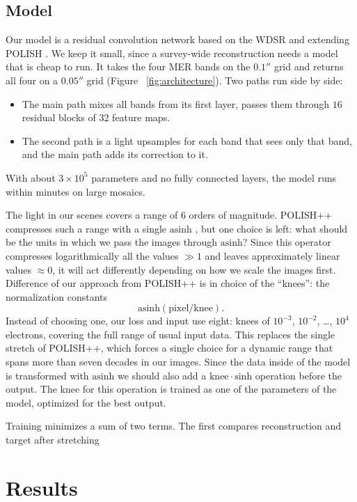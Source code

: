 \documentclass[linenumbers,trackchanges,twocolumn]{aastex701}
\begin{document}
\subsection{Model}
Our model is a residual convolution network based on the WDSR \citep{Yu2018} and extending POLISH \citep{Connor2022}.
We keep it small, since a survey-wide reconstruction needs a model that is cheap to run.
It takes the four MER bands on the $0.1''$ grid and returns all four on a $0.05''$ grid (Figure ~\ref{fig:architecture}).
Two paths run side by side: \begin{itemize}
    \item The main path mixes all bands from its first layer, passes them through $16$ residual blocks of $32$ feature maps.
    \item The second path is a light upsamples for each band that sees only that band, and the main path adds its correction to it. 
\end{itemize}
With about $3\times 10^5$ parameters and no fully connected layers, the model runs within minutes on large mosaics.

The light in our scenes covers a range of $6$ orders of magnitude.
POLISH++ compresses such a range with a single $\mathrm{asinh}$ \citep{Wu2026}, but one choice is left: what should be the units in which we pass the images through $\mathrm{asinh}$? 
Since this operator compresses logarithmically all the values $\gg 1$ and leaves approximately linear values $\approx 0$, it will act differently depending on how we scale the images first.
Difference of our approach from POLISH++ is in choice of the ``knees'': the normalization constants $$\mathrm{asinh}(\text{pixel} / \text{knee}).$$
Instead of choosing one, our loss and input use eight: knees of $10^{-3}$, $10^{-2}$, \ldots, $10^{4}$ electrons, covering the full range of usual input data.
This replaces the single stretch of POLISH++, which forces a single choice for a dynamic range that spans more than seven decades in our images. 
Since the data inside of the model is transformed with $\mathrm{asinh}$ we should also add a $\text{knee}\cdot\mathrm{sinh}$ operation before the output. 
The knee for this operation is trained as one of the parameters of the model, optimized for the best output.

Training minimizes a sum of two terms.
The first compares reconstruction and target after stretching



\section{Results}
\end{document}
